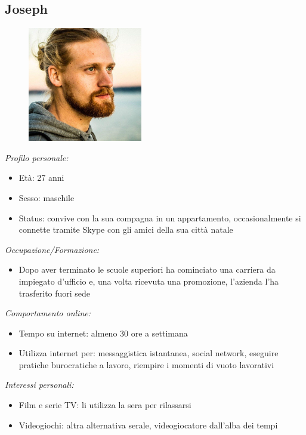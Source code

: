 \subsection{Joseph}
\begin{figure}[H]
    \centering
    \includegraphics[width=50mm]{img/personas/joseph.jpg}
    \label{fig:personas_joseph}
\end{figure}
\textit{Profilo personale:}
\begin{itemize}
    \item Età: 27 anni
    \item Sesso: maschile
    \item Status: convive con la sua compagna in un appartamento, occasionalmente si connette tramite Skype con gli amici della sua città natale
\end{itemize}
\textit{Occupazione/Formazione:}
\begin{itemize}
    \item Dopo aver terminato le scuole superiori ha cominciato una carriera da impiegato d'ufficio e, una volta ricevuta una promozione, l'azienda l'ha trasferito fuori sede
\end{itemize}
\textit{Comportamento online:}
\begin{itemize}
    \item Tempo su internet: almeno 30 ore a settimana
    \item Utilizza internet per: messaggistica istantanea, social network, eseguire pratiche burocratiche a lavoro, riempire i momenti di vuoto lavorativi
\end{itemize}
\textit{Interessi personali:}
\begin{itemize}
    \item Film e serie TV: li utilizza la sera per rilassarsi
    \item Videogiochi: altra alternativa serale, videogiocatore dall'alba dei tempi
\end{itemize}